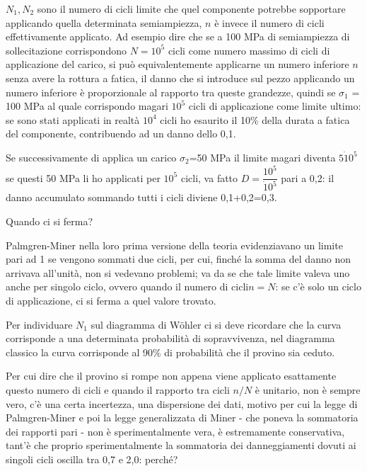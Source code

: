 			 $ N_1, N_2 $ sono il numero di cicli limite che quel componente potrebbe sopportare applicando quella determinata semiampiezza, $ n $  è invece il numero di cicli effettivamente applicato. Ad esempio dire che se a 100 MPa di semiampiezza di sollecitazione corrispondono $ N=10^5 $ cicli come numero massimo di cicli di applicazione del carico, si può equivalentemente applicarne un numero inferiore $ n $ senza avere la rottura a fatica, il danno che si introduce sul pezzo applicando un numero inferiore è proporzionale al rapporto tra queste grandezze, quindi se $\sigma_1$ = 100 MPa al quale corrispondo magari $10^5$ cicli di applicazione come limite ultimo: se sono stati applicati in realtà $10^4$ cicli ho esaurito il 10\% della durata a fatica del componente, contribuendo ad un danno dello 0,1. 
			 
			 Se successivamente di applica un carico $\sigma_2$=50 MPa il limite magari diventa $5\dot10^5$ se questi 50 MPa li ho applicati per $10^5$ cicli, va fatto $D = \dfrac{10^5}{\dot10^5}$ pari a 0,2: il danno accumulato sommando tutti i cicli diviene 0,1+0,2=0,3. \newline 
			 
			 Quando ci si ferma?
			 			 
			 Palmgren-Miner nella loro prima versione della teoria evidenziavano un limite pari ad 1 se vengono sommati due cicli, per cui, finché la somma del danno non arrivava all'unità, non si vedevano problemi; va da se che tale limite valeva uno anche per singolo ciclo, ovvero quando il numero di cicli$ n=N$: se c'è solo un ciclo di applicazione, ci si ferma a quel valore trovato.
			 
			 Per individuare $N_1$ sul diagramma di Wöhler ci si deve ricordare che la curva corrisponde a una determinata probabilità di sopravvivenza, nel diagramma classico la curva corrisponde al 90\% di probabilità che il provino sia ceduto. \newline 
			 
			 Per cui dire che il provino si rompe non appena viene applicato esattamente questo numero di cicli e quando il rapporto tra cicli $n/N$ è unitario, non è sempre vero, c'è una certa incertezza, una dispersione dei dati, motivo per cui la legge di Palmgren-Miner e poi la legge generalizzata di Miner - che poneva la sommatoria dei rapporti pari - non è sperimentalmente vera, è estremamente conservativa, tant'è che proprio sperimentalmente  la sommatoria dei danneggiamenti dovuti ai singoli cicli oscilla tra 0,7 e 2,0: perché? 
			 
